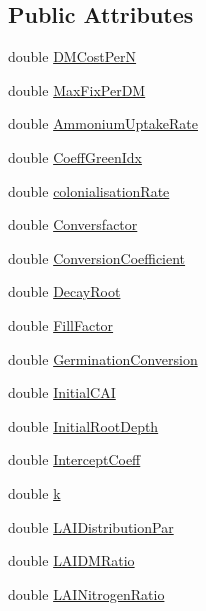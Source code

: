 \subsection*{Public Attributes}
\begin{DoxyCompactItemize}
\item 
double \hyperlink{classcrop_parameters_crop_ac22d342576a5f3f5f769dd1dedaaa391}{DMCostPerN}
\item 
double \hyperlink{classcrop_parameters_crop_ad3c7743c096df81c1328482d475c30fc}{MaxFixPerDM}
\item 
double \hyperlink{classcrop_parameters_crop_aa79bdd84dda982cc42c403d7cd78fad3}{AmmoniumUptakeRate}
\item 
double \hyperlink{classcrop_parameters_crop_a7a80787a85a883a1840432020286a205}{CoeffGreenIdx}
\item 
double \hyperlink{classcrop_parameters_crop_a8b9bff4e41e698a89c93fb7804e80de0}{colonialisationRate}
\item 
double \hyperlink{classcrop_parameters_crop_aefd1f5ace4991836a705c9a72f399fdf}{Conversfactor}
\item 
double \hyperlink{classcrop_parameters_crop_a58ba617196f0196cd2a7d417b4947e5d}{ConversionCoefficient}
\item 
double \hyperlink{classcrop_parameters_crop_a141269bfc3cdaf44fbc7b35115a8c49e}{DecayRoot}
\item 
double \hyperlink{classcrop_parameters_crop_ab151fb104ba9b66aae5fafcf39b73597}{FillFactor}
\item 
double \hyperlink{classcrop_parameters_crop_a97ec576360696e2847c5d0cda2feb8a1}{GerminationConversion}
\item 
double \hyperlink{classcrop_parameters_crop_a1b5c1b5c4954cfe974aecf6955ca9e07}{InitialCAI}
\item 
double \hyperlink{classcrop_parameters_crop_ad50d062dc477c329d12e28a42c2f6669}{InitialRootDepth}
\item 
double \hyperlink{classcrop_parameters_crop_a22157423293081003e5b53b3e93aee69}{InterceptCoeff}
\item 
double \hyperlink{classcrop_parameters_crop_a8366e75185df11854b1319b56f459ab6}{k}
\item 
double \hyperlink{classcrop_parameters_crop_ad06a27bfb5ee4b5359c30a216989d502}{LAIDistributionPar}
\item 
double \hyperlink{classcrop_parameters_crop_aa186c677803544bba15d018a9db1ac5e}{LAIDMRatio}
\item 
double \hyperlink{classcrop_parameters_crop_a3327e2eefc7e4538008c5366e4973ad9}{LAINitrogenRatio}

\end{DoxyCompactItemize}
